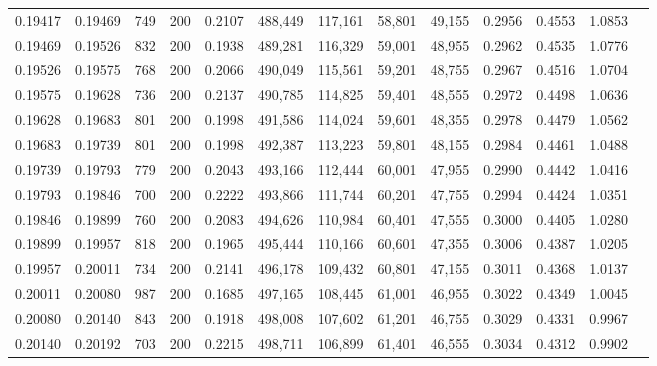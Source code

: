 \begin{tabular}{rrrrrrrrrrrrr}
0.19417 & 0.19469 &   749 & 200 &                                     0.2107 & 488,449 & 117,161 &  58,801 &  49,155 & 0.2956 & 0.4553 & 1.0853 \\
0.19469 & 0.19526 &   832 & 200 &                                     0.1938 & 489,281 & 116,329 &  59,001 &  48,955 & 0.2962 & 0.4535 & 1.0776 \\
0.19526 & 0.19575 &   768 & 200 &                                     0.2066 & 490,049 & 115,561 &  59,201 &  48,755 & 0.2967 & 0.4516 & 1.0704 \\
0.19575 & 0.19628 &   736 & 200 &                                     0.2137 & 490,785 & 114,825 &  59,401 &  48,555 & 0.2972 & 0.4498 & 1.0636 \\
0.19628 & 0.19683 &   801 & 200 &                                     0.1998 & 491,586 & 114,024 &  59,601 &  48,355 & 0.2978 & 0.4479 & 1.0562 \\
0.19683 & 0.19739 &   801 & 200 &                                     0.1998 & 492,387 & 113,223 &  59,801 &  48,155 & 0.2984 & 0.4461 & 1.0488 \\
0.19739 & 0.19793 &   779 & 200 &                                     0.2043 & 493,166 & 112,444 &  60,001 &  47,955 & 0.2990 & 0.4442 & 1.0416 \\
0.19793 & 0.19846 &   700 & 200 &                                     0.2222 & 493,866 & 111,744 &  60,201 &  47,755 & 0.2994 & 0.4424 & 1.0351 \\
0.19846 & 0.19899 &   760 & 200 &                                     0.2083 & 494,626 & 110,984 &  60,401 &  47,555 & 0.3000 & 0.4405 & 1.0280 \\
0.19899 & 0.19957 &   818 & 200 &                                     0.1965 & 495,444 & 110,166 &  60,601 &  47,355 & 0.3006 & 0.4387 & 1.0205 \\
0.19957 & 0.20011 &   734 & 200 &                                     0.2141 & 496,178 & 109,432 &  60,801 &  47,155 & 0.3011 & 0.4368 & 1.0137 \\
0.20011 & 0.20080 &   987 & 200 &                                     0.1685 & 497,165 & 108,445 &  61,001 &  46,955 & 0.3022 & 0.4349 & 1.0045 \\
0.20080 & 0.20140 &   843 & 200 &                                     0.1918 & 498,008 & 107,602 &  61,201 &  46,755 & 0.3029 & 0.4331 & 0.9967 \\
0.20140 & 0.20192 &   703 & 200 &                                     0.2215 & 498,711 & 106,899 &  61,401 &  46,555 & 0.3034 & 0.4312 & 0.9902 \\

\end{tabular}
